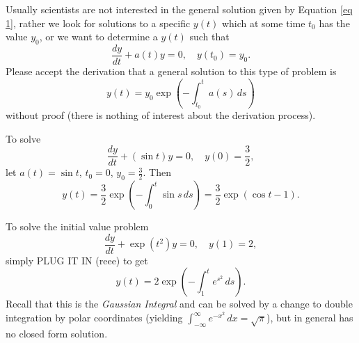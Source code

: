 Usually scientists are not interested in the general solution given by Equation \eqref{eq 1}, rather we look for solutions to a specific $y(t)$ which at some time $t_0$ has the value $y_0$, or we want to determine a $y(t)$ such that \[
    \frac{dy}{dt}+a(t)y=0, \quad y(t_0)=y_0.
\]
Please accept the derivation that a general solution to this type of problem is 
\begin{equation}\label{eq_2}
    y(t)=y_0\exp\left( -\int_{t_0}^{t} a(s) \, ds \right)  
\end{equation}
without proof (there is nothing of interest about the derivation process).
\begin{example}
    To solve \[
        \frac{dy}{dt}+(\sin t)y=0, \quad y(0)=\frac{3}{2},
    \]
    let  $a(t)=\sin t$, $t_0=0$, $y_0=\frac{3}{2}$. Then \[
        y(t)=\frac{3}{2}\exp\left( -\int_{0}^{t} \sin s \, ds \right)  =\frac{3}{2} \exp \left( \cos t - 1 \right).
    \]
\end{example}
\begin{example}
    To solve the initial value problem \[
        \frac{dy}{dt}+ \exp(t^2)y=0, \quad y(1)=2,
    \]
    simply PLUG IT IN (reee) to get \[
        y(t)=2\exp\left( -\int_{1}^{t} e^{s^2} \, ds \right).
    \]
    Recall that this is the \emph{Gaussian Integral} and can be solved by a change to double integration by polar coordinates (yielding $\int_{-\infty}^{\infty} e^{-x^2} \, dx = \sqrt{\pi}$), but in general has no closed form solution.
\end{example}

